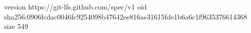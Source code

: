 version https://git-lfs.github.com/spec/v1
oid sha256:0906fcdac0046fc9254098b47642ee816ae31615fde1b6a6c1f9635376614368
size 549
